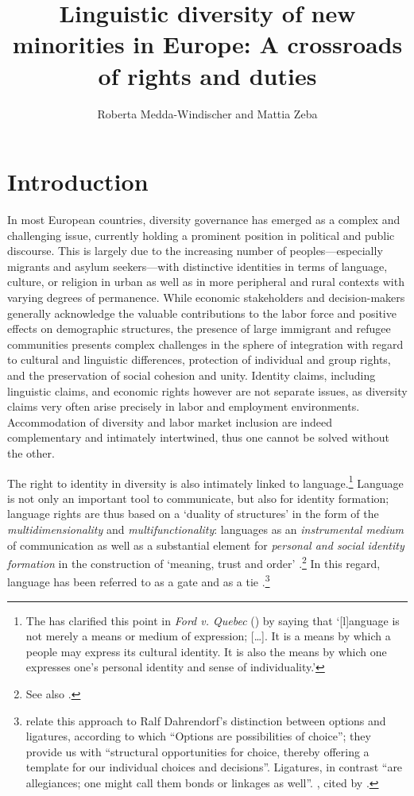 \documentclass[output=paper,colorlinks,citecolor=brown]{langscibook}
\author{Roberta Medda-Windischer\orcid{}\affiliation{Institute for Minority Rights, Eurac Research (Bolzano, Italy)} and Mattia Zeba\orcid{/0000-0001-7609-1234}\affiliation{Institute for Minority Rights, Eurac Research (Bolzano, Italy)}}
\title[Linguistic diversity of new minorities in Europe]{Linguistic diversity of new minorities in Europe: A crossroads of rights and duties}
\begin{document}
\maketitle

\section{Introduction}\label{ch2.4.ss.1}

In most European countries, diversity governance has emerged as a complex and challenging issue, currently holding a prominent position in political and public discourse. This is largely due to the increasing number of peoples—especially migrants and asylum seekers—with distinctive identities in terms of language, culture, or religion in urban as well as in more peripheral and rural contexts with varying degrees of permanence. While economic stakeholders and decision-makers generally acknowledge the valuable contributions to the labor force and positive effects on demographic structures, the presence of large immigrant and refugee communities presents complex challenges in the sphere of integration with regard to cultural and linguistic differences, protection of individual and group rights, and the preservation of social cohesion and unity. Identity claims, including linguistic claims, and economic rights however are not separate issues, as diversity claims very often arise precisely in labor and employment environments. Accommodation of diversity and labor market inclusion are indeed complementary and intimately intertwined, thus one cannot be solved without the other.
\largerpage[2]

The right to identity in diversity is also intimately linked to language.\footnote{The \citeauthor{scc1988_ford_quebec} has clarified this point in \textit{Ford v. Quebec} (\citeyear{scc1988_ford_quebec}) by saying that `[l]anguage is not merely a means or medium of expression; […]. It is a means by which a people may express its cultural identity. It is also the means by which one expresses one's personal identity and sense of individuality.' } Language is not only an important tool to communicate, but also for identity formation; language rights are thus based on a `duality of structures' \citep{giddens1984} in the form of the \textit{multidimensionality} and \textit{multifunctionality}: languages as an \textit{instrumental medium} of communication as well as a substantial element for \textit{personal and social identity formation} in the construction of `meaning, trust and order' \citep{eisenstadt1995}.\footnote{See also \citet[34]{VertovecWessendorf2005}.} In this regard, language has been referred to as a gate and as a tie \citep{kraus_kazlauskaite_gurbuz2014}.\footnote{\citeauthor{kraus_kazlauskaite_gurbuz2014} relate this approach to Ralf Dahrendorf's distinction between options and ligatures, according to which ``Options are possibilities of choice''; they provide us with ``structural opportunities for choice, thereby offering a template for our individual choices and decisions''. Ligatures, in contrast ``are allegiances; one might call them bonds or linkages as well''. \citet{dahrendorf1979}, cited by \citet[521]{kraus_kazlauskaite_gurbuz2014}.}
\end{document}
